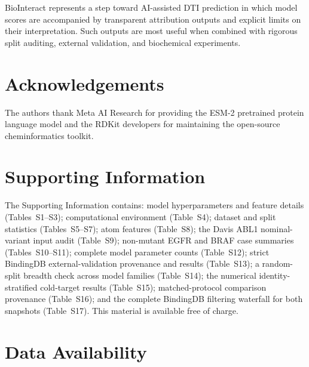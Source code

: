 \documentclass[fleqn,10pt]{wlscirep}
\begin{document}
BioInteract represents a step toward AI-assisted DTI prediction in which model
scores are accompanied by transparent attribution outputs and explicit limits on
their interpretation.  Such outputs are most useful when combined with rigorous
split auditing, external validation, and biochemical experiments.

\section*{Acknowledgements}

The authors thank Meta AI Research for providing the ESM-2 pretrained protein
language model and the RDKit developers for maintaining the open-source
cheminformatics toolkit.

\section*{Supporting Information}

The Supporting Information contains: model hyperparameters and feature details
(Tables~S1--S3); computational environment (Table~S4); dataset and split
statistics (Tables~S5--S7); atom features (Table~S8); the Davis ABL1
nominal-variant input audit (Table~S9); non-mutant EGFR and BRAF case summaries
(Tables~S10--S11); complete model parameter counts (Table~S12); strict
BindingDB external-validation provenance and results (Table~S13);
a random-split breadth check across model families
(Table~S14); the numerical identity-stratified cold-target results
(Table~S15); matched-protocol comparison provenance (Table~S16); and the
complete BindingDB filtering waterfall for both snapshots (Table~S17).
This material is available free of charge.

\section*{Data Availability}
\end{document}
